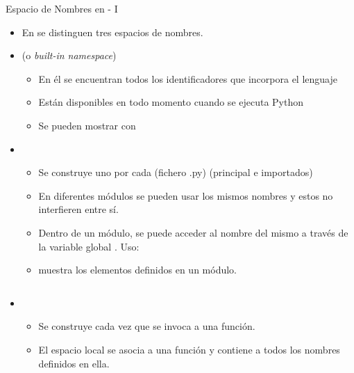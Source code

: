 \documentclass[10pt,envcountsect,spanish]{beamer}
\begin{document}
\begin{frame}{Espacio de Nombres en  - I } 

\begin{itemize}

\item En  se distinguen tres espacios de nombres.


\item {} (o \textit{built-in namespace}) 
	\begin{itemize}
	\item En él se encuentran todos los identificadores que incorpora el lenguaje
	\item Están disponibles en todo momento cuando se ejecuta Python 
	\item Se pueden mostrar con 
	\end{itemize}
	
\item {} 
	\begin{itemize}
	\item Se construye uno por cada  (fichero .py) (principal e importados)
	\item En diferentes módulos se pueden usar los mismos nombres y estos no interfieren entre sí. 
	\item Dentro de un módulo, se puede acceder al nombre del mismo a través de la variable global . \hfill Uso: 
	\item {} muestra los elementos definidos en un módulo.
	\end{itemize}
\end{itemize}

\begin{columns}
\begin{column}{.6\textwidth}
\begin{itemize}	
\item {} 
	\begin{itemize}
	\item Se construye cada vez que se invoca a una función.
	\item El espacio local se asocia a una función y contiene a todos los nombres definidos en ella.  
	\end{itemize}



\end{itemize}
\end{column}
\end{columns}
\end{frame}
\end{document}
